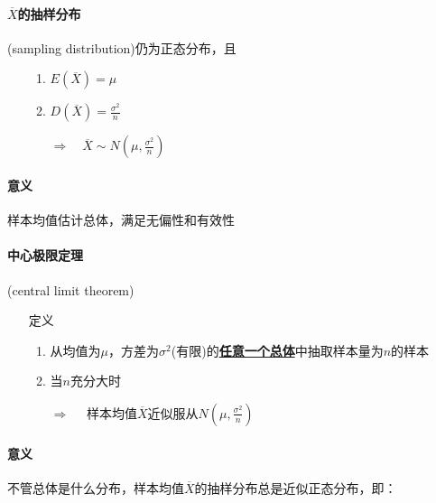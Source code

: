 \documentclass[UTF8,10pt]{book}
\begin{document}
            \paragraph{$\overline{X}$的抽样分布} (sampling distribution)仍为正态分布，且
                \begin{itemize}
                    \item [] {
                        \begin{enumerate}
                            \item $E(\overline{X}) = \mu$
                            \item $D(\overline{X}) = \frac{\sigma^2}{n} $                            
                            
                            $ \Rightarrow \quad \overline{X} \sim N(\mu,\frac{\sigma^2}{n}) $
                        \end{enumerate}
                    }
                \end{itemize}
            

                \paragraph{意义} {\kaishu 样本均值估计总体，满足无偏性和有效性}

            \paragraph{中心极限定理} (central limit theorem)
                \begin{itemize}
                    \item [定义] {
                        \begin{enumerate}
                            \item 从均值为$\mu$，方差为$\sigma^2$(有限)的\underline{\textbf{任意一个总体}}中抽取样本量为$n$的样本
                            \item 当$n$充分大时
                            
                            $ \Rightarrow \quad  $ 样本均值$\overline{X}$近似服从$N(\mu,\frac{\sigma^2}{n})$
                        \end{enumerate}
                    }
                \end{itemize}

                \paragraph{意义} {\kaishu 不管总体是什么分布，样本均值$\overline{X}$的抽样分布总是近似正态分布，即：}
\end{document}
